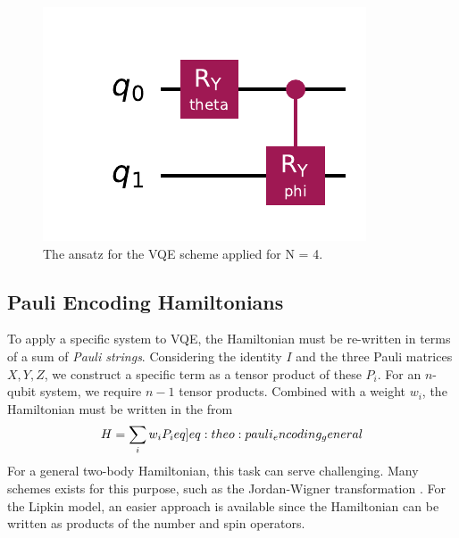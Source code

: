 \begin{figure}
    \centering
    \includegraphics[scale=0.8]{figs/ansatz.pdf}
    \caption{The ansatz for the VQE scheme applied for N = 4. }
    \label{fig:ansatz}
\end{figure}

\subsection{Pauli Encoding Hamiltonians}
To apply a specific system to VQE, the Hamiltonian must be re-written in terms of a sum of \textit{Pauli strings}. Considering the identity $I$ and the three Pauli matrices $X, Y, Z$, we construct a specific term as a tensor product of these $P_i$. For an $n$-qubit system, we require $n-1$ tensor products. Combined with a weight $w_i$, the Hamiltonian must be written in the from
\begin{align}
    H = \sum_i w_i P_i \label[eq]{eq:theo:pauli_encoding_general}
\end{align}
For a general two-body Hamiltonian, this task can serve challenging. Many schemes exists for this purpose, such as the Jordan-Wigner transformation \citep{steudtnerMethodsSimulateFermions2019}. For the Lipkin model, an easier approach is available since the Hamiltonian can be written as products of the number and spin operators.
